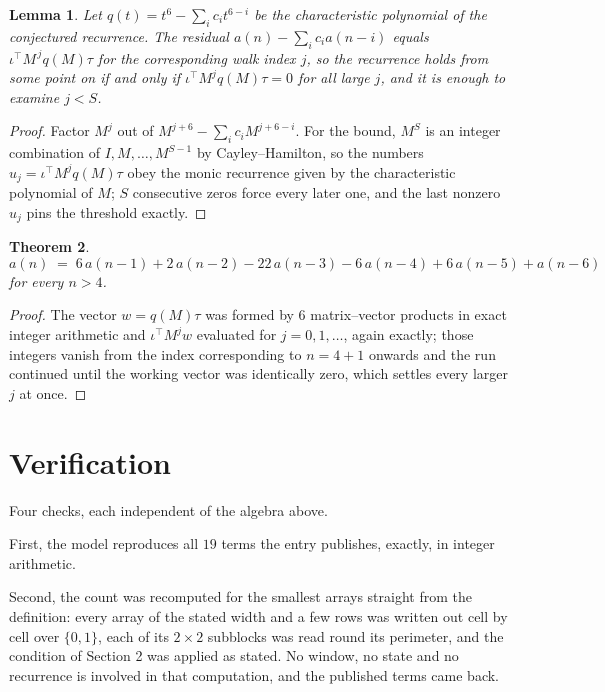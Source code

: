 \documentclass[11pt,a4paper]{article}
\theoremstyle{plain}
\newtheorem{theorem}{Theorem}
\newtheorem{lemma}[theorem]{Lemma}
\theoremstyle{definition}
\begin{document}
\begin{lemma}\label{lem:crit}
Let $q(t)=t^{6}-\sum_i c_it^{6-i}$ be the characteristic polynomial of the
conjectured recurrence. The residual $a(n)-\sum_ic_ia(n-i)$ equals
$\iota^{\!\top}M^{\,j}q(M)\tau$ for the corresponding walk index $j$, so the recurrence
holds from some point on if and only if $\iota^{\!\top}M^{j}q(M)\tau=0$ for all large $j$,
and it is enough to examine $j<S$.
\end{lemma}

\begin{proof}
Factor $M^{j}$ out of $M^{j+6}-\sum_ic_iM^{j+6-i}$. For the bound, $M^{S}$
is an integer combination of $I,M,\dots,M^{S-1}$ by Cayley--Hamilton, so the numbers
$u_j=\iota^{\!\top}M^{j}q(M)\tau$ obey the monic recurrence given by the characteristic
polynomial of $M$; $S$ consecutive zeros force every later one, and the last nonzero $u_j$
pins the threshold exactly.
\end{proof}

\begin{theorem}
\[
a(n)\;=\;6\,a(n-1) + 2\,a(n-2) - 22\,a(n-3) - 6\,a(n-4) + 6\,a(n-5) + a(n-6)
\]
for every $n>4$.
\end{theorem}

\begin{proof}
The vector $w=q(M)\tau$ was formed by $6$ matrix--vector products in exact integer
arithmetic and $\iota^{\!\top}M^{j}w$ evaluated for $j=0,1,\dots$, again exactly; those
integers vanish from the index corresponding to $n=4+1$ onwards and the run continued
until the working vector was identically zero, which settles every larger $j$ at once.
\end{proof}

\section{Verification}

Four checks, each independent of the algebra above.

First, the model reproduces all $19$ terms the entry publishes, exactly, in integer
arithmetic.

Second, the count was recomputed for the smallest arrays straight from the definition: every
array of the stated width and a few rows was written out cell by cell over $\{0,1\}$, each of
its $2\times2$ subblocks was read round its perimeter, and the condition of Section 2 was
applied as stated. No window, no state and no recurrence is involved in that computation, and
the published terms came back.
\end{document}
